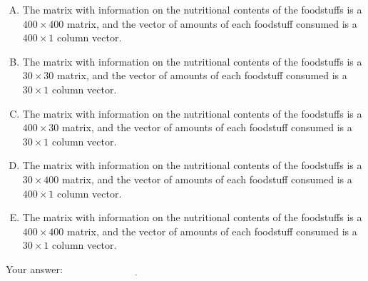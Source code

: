 \documentclass[10pt]{amsart}
\begin{document}
\begin{enumerate}
  \begin{enumerate}[(A)]
  \item The matrix with information on the nutritional contents of the
    foodstuffs is a $400 \times 400$ matrix, and the vector of amounts
    of each foodstuff consumed is a $400 \times 1$ column vector.
  \item The matrix with information on the nutritional contents of the
    foodstuffs is a $30 \times 30$ matrix, and the vector of amounts
    of each foodstuff consumed is a $30 \times 1$ column vector.
  \item The matrix with information on the nutritional contents of the
    foodstuffs is a $400 \times 30$ matrix, and the vector of amounts
    of each foodstuff consumed is a $30 \times 1$ column vector.
  \item The matrix with information on the nutritional contents of the
    foodstuffs is a $30 \times 400$ matrix, and the vector of amounts
    of each foodstuff consumed is a $400 \times 1$ column vector.
  \item The matrix with information on the nutritional contents of the
    foodstuffs is a $400 \times 400$ matrix, and the vector of amounts
    of each foodstuff consumed is a $30 \times 1$ column vector.
  \end{enumerate}

  \vspace{0.1in}
  Your answer: $\underline{\qquad\qquad\qquad\qquad\qquad\qquad\qquad}$
  \vspace{0.1in}

\end{enumerate}
\end{document}
